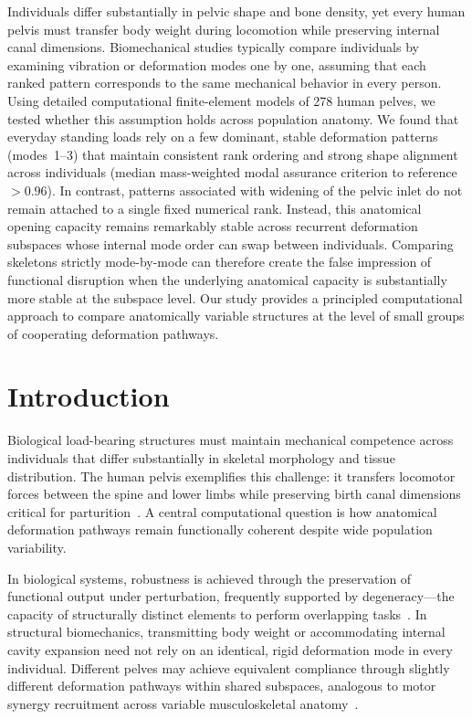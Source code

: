 \documentclass[11pt]{article}
\begin{document}
Individuals differ substantially in pelvic shape and bone density, yet every human pelvis must transfer body weight during locomotion while preserving internal canal dimensions.
Biomechanical studies typically compare individuals by examining vibration or deformation modes one by one, assuming that each ranked pattern corresponds to the same mechanical behavior in every person.
Using detailed computational finite-element models of 278 human pelves, we tested whether this assumption holds across population anatomy.
We found that everyday standing loads rely on a few dominant, stable deformation patterns (modes~1--3) that maintain consistent rank ordering and strong shape alignment across individuals (median mass-weighted modal assurance criterion to reference $> 0.96$).
In contrast, patterns associated with widening of the pelvic inlet do not remain attached to a single fixed numerical rank.
Instead, this anatomical opening capacity remains remarkably stable across recurrent deformation subspaces whose internal mode order can swap between individuals.
Comparing skeletons strictly mode-by-mode can therefore create the false impression of functional disruption when the underlying anatomical capacity is substantially more stable at the subspace level.
Our study provides a principled computational approach to compare anatomically variable structures at the level of small groups of cooperating deformation pathways.


\section{Introduction}
\label{sec:introduction}

Biological load-bearing structures must maintain mechanical competence across individuals that differ substantially in skeletal morphology and tissue distribution.
The human pelvis exemplifies this challenge: it transfers locomotor forces between the spine and lower limbs while preserving birth canal dimensions critical for parturition~\citep{Washburn1960,Gruss2015,HenyssKuchar2025BoneDat}.
A central computational question is how anatomical deformation pathways remain functionally coherent despite wide population variability.

In biological systems, robustness is achieved through the preservation of functional output under perturbation, frequently supported by degeneracy---the capacity of structurally distinct elements to perform overlapping tasks~\citep{Kitano2004,Kitano2007,Whitacre2010,Whitacre2012}.
In structural biomechanics, transmitting body weight or accommodating internal cavity expansion need not rely on an identical, rigid deformation mode in every individual.
Different pelves may achieve equivalent compliance through slightly different deformation pathways within shared subspaces, analogous to motor synergy recruitment across variable musculoskeletal anatomy~\citep{Ting2012}.
\end{document}
